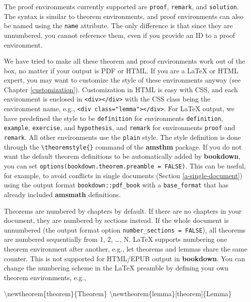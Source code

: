 \documentclass[
  12pt,
]{krantz}
\newenvironment{Shaded}{\begin{snugshade}}{\end{snugshade}}
\newcommand{\FunctionTok}[1]{\textcolor[rgb]{0.00,0.00,0.00}{#1}}
\newcommand{\NormalTok}[1]{#1}
\theoremstyle{definition}
\theoremstyle{definition}
\theoremstyle{definition}
\theoremstyle{definition}
\theoremstyle{remark}
\begin{document}
The proof environments currently supported are \texttt{proof}, \texttt{remark}, and \texttt{solution}. The syntax is similar to theorem environments, and proof environments can also be named using the \texttt{name} attribute. The only difference is that since they are unnumbered, you cannot reference them, even if you provide an ID to a proof environment.

We have tried to make all these theorem and proof environments work out of the box, no matter if your output is PDF or HTML. If you are a LaTeX or HTML expert, you may want to customize the style of these environments anyway (see Chapter \ref{customization}). Customization in HTML is easy with CSS, and each environment is enclosed in \texttt{\textless{}div\textgreater{}\textless{}/div\textgreater{}} with the CSS class being the environment name, e.g., \texttt{\textless{}div\ class="lemma"\textgreater{}\textless{}/div\textgreater{}}. For LaTeX output, we have predefined the style to be \texttt{definition} for environments \texttt{definition}, \texttt{example}, \texttt{exercise}, and \texttt{hypothesis}, and \texttt{remark} for environments \texttt{proof} and \texttt{remark}. All other environments use the \texttt{plain} style. The style definition is done through the \texttt{\textbackslash{}theoremstyle\{\}} command of the \textbf{amsthm} package. If you do not want the default theorem definitions to be automatically added by \textbf{bookdown}, you can set \texttt{options(bookdown.theorem.preamble\ =\ FALSE)}. This can be useful, for example, to avoid conflicts in single documents (Section \ref{a-single-document}) using the output format \texttt{bookdown::pdf\_book} with a \texttt{base\_format} that has already included \textbf{amsmath} definitions.

Theorems are numbered by chapters by default. If there are no chapters in your document, they are numbered by sections instead. If the whole document is unnumbered (the output format option \texttt{number\_sections\ =\ FALSE}), all theorems are numbered sequentially from 1, 2, \ldots, N. LaTeX supports numbering one theorem environment after another, e.g., let theorems and lemmas share the same counter. This is not supported for HTML/EPUB output in \textbf{bookdown}. You can change the numbering scheme in the LaTeX preamble by defining your own theorem environments, e.g.,

\begin{Shaded}
\begin{Highlighting}[]
\FunctionTok{\textbackslash{}newtheorem}\NormalTok{\{theorem\}\{Theorem\}}
\FunctionTok{\textbackslash{}newtheorem}\NormalTok{\{lemma\}[theorem]\{Lemma\}}
\end{Highlighting}
\end{Shaded}
\end{document}
